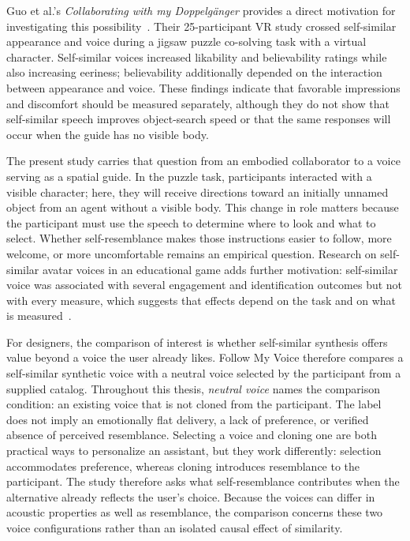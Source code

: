 Guo et al.'s \emph{Collaborating with my Doppelg\"anger} provides a direct motivation for investigating this possibility~\cite{guo2024doppelganger}. Their 25-participant VR study crossed self-similar appearance and voice during a jigsaw puzzle co-solving task with a virtual character. Self-similar voices increased likability and believability ratings while also increasing eeriness; believability additionally depended on the interaction between appearance and voice. These findings indicate that favorable impressions and discomfort should be measured separately, although they do not show that self-similar speech improves object-search speed or that the same responses will occur when the guide has no visible body.

The present study carries that question from an embodied collaborator to a voice serving as a spatial guide. In the puzzle task, participants interacted with a visible character; here, they will receive directions toward an initially unnamed object from an agent without a visible body. This change in role matters because the participant must use the speech to determine where to look and what to select. Whether self-resemblance makes those instructions easier to follow, more welcome, or more uncomfortable remains an empirical question. Research on self-similar avatar voices in an educational game adds further motivation: self-similar voice was associated with several engagement and identification outcomes but not with every measure, which suggests that effects depend on the task and on what is measured~\cite{kao2021selfsimilar}.

For designers, the comparison of interest is whether self-similar synthesis offers value beyond a voice the user already likes. Follow My Voice therefore compares a self-similar synthetic voice with a neutral voice selected by the participant from a supplied catalog. Throughout this thesis, \emph{neutral voice} names the comparison condition: an existing voice that is not cloned from the participant. The label does not imply an emotionally flat delivery, a lack of preference, or verified absence of perceived resemblance. Selecting a voice and cloning one are both practical ways to personalize an assistant, but they work differently: selection accommodates preference, whereas cloning introduces resemblance to the participant. The study therefore asks what self-resemblance contributes when the alternative already reflects the user's choice. Because the voices can differ in acoustic properties as well as resemblance, the comparison concerns these two voice configurations rather than an isolated causal effect of similarity.

